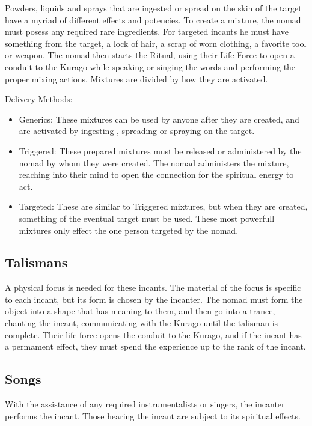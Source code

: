\begin{multicols*}{2}
Powders, liquids and sprays that are ingested or spread on the skin of the target have a myriad of different effects and potencies.  To create a mixture, the nomad must posess any required rare ingredients. For targeted incants he must have something from the target, a lock of hair, a scrap of worn clothing, a favorite tool or weapon. The nomad then starts the Ritual, using their Life Force to open a conduit to the Kurago while speaking or singing the words and performing the proper mixing actions. Mixtures are divided by how they are activated.

Delivery Methods:
\begin{itemize}
\item Generics: These mixtures can be used by anyone after they are created, and are activated by ingesting , spreading or spraying on the target.

\item Triggered: These prepared mixtures must be released or administered by the nomad by whom they were created. The nomad administers the mixture, reaching into their mind to open the connection for the spiritual energy to act.

\item Targeted: These are similar to Triggered mixtures, but when they are created, something of the eventual target must be used. These most powerfull mixtures only effect the one person targeted by the nomad.
\end{itemize}

\subsection{Talismans}

A physical focus is needed for these incants. The material of the focus is specific to each incant, but its form is chosen by the incanter. The nomad must form the object into a shape that has meaning to them, and then go into a trance, chanting the incant, communicating with the Kurago until the talisman is complete. Their life force opens the conduit to the Kurago, and if the incant has a permament effect, they must spend the experience up to the rank of the incant.

\subsection{Songs}

With the assistance of any required instrumentalists or singers, the incanter performs the incant. Those hearing the incant are subject to its spiritual effects.


\end{multicols*}
